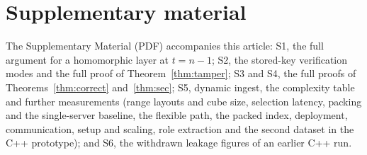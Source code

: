\section*{Supplementary material}
The Supplementary Material (PDF) accompanies this article: S1, the full
argument for a homomorphic layer at $t=n-1$; S2, the stored-key verification
modes and the full proof of Theorem~\ref{thm:tamper}; S3 and S4, the full
proofs of Theorems~\ref{thm:correct} and~\ref{thm:sec}; S5, dynamic ingest, the
complexity table and further measurements (range layouts and cube size,
selection latency, packing and the single-server baseline, the flexible path,
the packed index, deployment, communication, setup and scaling, role
extraction and the second dataset in the C++ prototype); and S6, the withdrawn
leakage figures of an earlier C++ run.
